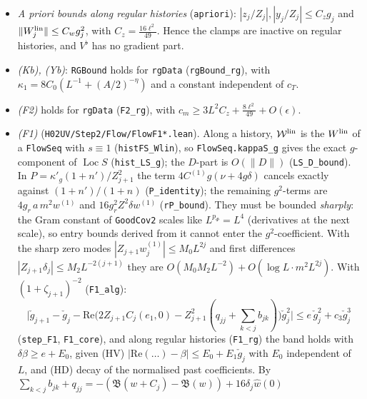 \documentclass[11pt]{amsart}
\theoremstyle{definition}
\theoremstyle{remark}
\numberwithin{equation}{section}
\newcommand{\Loc}{\operatorname{Loc}}
\begin{document}
\begin{itemize}
\begin{itemize}
  \item $\|K_{j+1}\|\le8C_0(L^{-1}+(A/2)^{-\eta})\|K_j\|+C_K(r^3+r\|K\|+\|K\|^2)$.
  \end{itemize}
  All norms are at the causal field scales. \texttt{stepK\_tsW} (output weight $2\cdot\frac A2$) absorbs
  $e^{4\delta}$ from $K^\flat$.
\item \emph{A priori bounds along regular histories} (\texttt{apriori}): $|z_j/Z_j|,|y_j/Z_j|\le C_zg_j$ and
  $\|W^{\rm lin}_j\|\le C_wg_j^2$, with $C_z=\frac{16\ell^2}{49}$. Hence the clamps are inactive on regular
  histories, and $V^\flat$ has no gradient part.
\item \emph{(Kb), (Yb)}: \texttt{RGBound} holds for \texttt{rgData} (\texttt{rgBound\_rg}), with
  $\kappa_1=8C_0(L^{-1}+(A/2)^{-\eta})$ and a constant independent of $c_T$.
\item \emph{(F2)} holds for \texttt{rgData} (\texttt{F2\_rg}), with
  $c_m\ge3L^2C_z+\frac{8\ell^2}{49}+O(\epsilon)$.
\item \emph{(F1)} (\texttt{H02UV/Step2/Flow/FlowF1*.lean}). Along a history, $\mathcal W^{\rm lin}$ is the $W^{\rm lin}$
  of a \texttt{FlowSeq} with $s\equiv1$ (\texttt{histFS\_Wlin}), so \texttt{FlowSeq.kappaS\_g} gives the
  exact $g$-component of $\Loc S$ (\texttt{hist\_LS\_g}); the $D$-part is $O(\|D\|)$ (\texttt{LS\_D\_bound}).
  In $P=\kappa'_g(1+n')/Z_{j+1}^2$ the term $4C^{(1)}g(\nu+4g\delta)$ cancels exactly against
  $(1+n')/(1+n)$ (\texttt{P\_identity}); the remaining $g^2$-terms are $4g_r\,a\,m^2w^{(1)}$ and $16g_r^2Z^2\delta w^{(1)}$
  (\texttt{rP\_bound}). They must be bounded \emph{sharply}: the Gram constant of \texttt{GoodCov2} scales
  like $L^{p_\Phi}=L^4$ (derivatives at the next scale), so entry bounds derived from it cannot enter the
  $g^2$-coefficient. With the sharp zero modes $|Z_{j+1}w^{(1)}_j|\le M_0L^{2j}$ and first differences
  $|Z_{j+1}\delta_j|\le M_2L^{-2(j+1)}$ they are $O(M_0M_2L^{-2})+O(\log L\cdot m^2L^{2j})$. With $(1+\zeta_{j+1})^{-2}$ (\texttt{F1\_alg}):
  \[
    \bigl|\check g_{j+1}-\check g_j-\mathrm{Re}\bigl(2Z_{j+1}C_j(e_1,0)-Z_{j+1}^2(q_{jj}+\textstyle\sum_{k<j}b_{jk})\bigr)\check g_j^2\bigr|
    \le e\,\check g_j^2+c_3\check g_j^3
  \]
  (\texttt{step\_F1}, \texttt{F1\_core}), and along regular histories (\texttt{F1\_rg}) the band
  holds with $\delta\beta\ge e+E_0$, given (HV) $|\mathrm{Re}(\dots)-\beta|\le E_0+E_1\check g_j$ with
  $E_0$ independent of $L$, and (HD) decay of the normalised past coefficients. By
  $\sum_{k<j}b_{jk}+q_{jj}=-(\mathfrak B(w+C_j)-\mathfrak B(w))+16\delta_j\hat w(0)$

\end{itemize}
\end{document}
